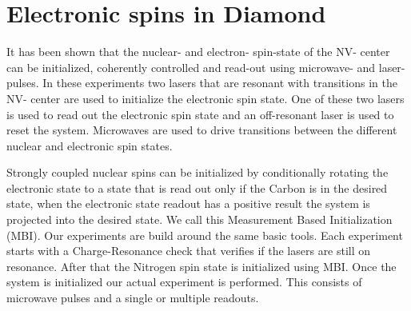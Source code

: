 \chapter{Electronic spins in Diamond}
\label{controlingspinsindiamond}




It has been shown that the nuclear- and electron- spin-state of the NV- center can be initialized, coherently controlled and read-out using microwave- and laser- pulses\citep{Robledo2011HighFidelity}. In these experiments two lasers that are resonant with transitions in the NV- center are used to initialize the electronic spin state. One of these two lasers is used to read out the electronic spin state and an off-resonant laser is used to reset the system.  Microwaves are used to drive transitions between the different nuclear and electronic spin states.

Strongly coupled nuclear spins can be initialized by conditionally rotating the electronic state to a state that is read out only if the Carbon is in the desired state, when the electronic state readout has a positive result the system is projected into the desired state. We call this Measurement Based Initialization (MBI).
%
%
%
%
%
%
Our experiments are build around the same basic tools. Each experiment starts with a Charge-Resonance check that verifies if the lasers are still on resonance. After that the Nitrogen spin state is initialized using MBI. Once the system is initialized our actual experiment is performed. This consists of microwave pulses and a single or multiple readouts.

